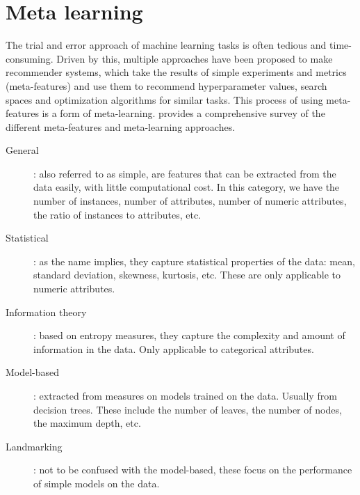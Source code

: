 \section{Meta learning}
\label{sec:meta-learning}

The trial and error approach of machine learning tasks is often tedious and
time-consuming. Driven by this, multiple approaches have been proposed to make
recommender systems, which take the results of simple experiments and metrics
(meta-features) and use them to recommend hyperparameter values, search spaces
and optimization algorithms for similar tasks. This process of using
meta-features is a form of meta-learning. \Textcite{rivolliMetafeaturesMetalearning2022}
provides a comprehensive survey of the different meta-features and meta-learning
approaches.

\begin{description}
    \item[General]: also referred to as simple, are features that can be
    extracted from the data easily, with little computational cost. In this
    category, we have the number of instances, number of attributes, number
    of numeric attributes, the ratio of instances to attributes, etc.

    \item[Statistical]: as the name implies, they capture statistical properties
    of the data: mean, standard deviation, skewness, kurtosis, etc.
    These are only applicable to numeric attributes.

    \item[Information theory]: based on entropy measures, they capture the
    complexity and amount of information in the data.
    Only applicable to categorical attributes.

    \item[Model-based]: extracted from measures on models trained on the data.
    Usually from decision trees. These include the number of leaves, the
    number of nodes, the maximum depth, etc.

    \item[Landmarking]: not to be confused with the model-based, these focus
    on the performance of simple models on the data.
\end{description}

